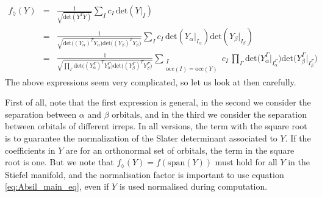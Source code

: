 \documentclass[a4paper,11pt]{article}
\begin{document}
\begin{eqnarray}
  f_\lozenge(Y)
  &=& \frac{1}{\sqrt{\text{det} \left( Y^T Y \right)}}
      \sum_{I} c_I \, \text{det} \left( Y\big|_I \right)\\
  &=& \frac{1}{\sqrt{
      \text{det} \Big( (Y_\alpha)^T Y_\alpha \Big)
      \text{det} \Big( (Y_\beta)^T Y_\beta \Big)
      }}
      \sum_{I} c_I \,
      \text{det} \left( Y_\alpha\big|_{I_\alpha} \right)
      \text{det} \left( Y_\beta\big|_{I_\beta} \right)\\\label{eq:f_diam_spin_irrep}
  &=& \frac{1}{\sqrt{
      \prod_\Gamma
      \text{det} \Big( (Y_\alpha^\Gamma)^T Y_\alpha^\Gamma \Big)
      \text{det} \Big( (Y_\beta^\Gamma)^T Y_\beta^\Gamma \Big)
      }}
      \sum_{\substack{I\\\text{occ}(I) = \text{occ}(Y)}} c_I \,
  \prod_\Gamma
  \text{det} \Big( Y_\alpha^\Gamma\big|_{I_\alpha^\Gamma} \Big)
  \text{det} \Big( Y_\beta^\Gamma\big|_{I_\beta^\Gamma} \Big)
\end{eqnarray}
The above expressions seem very complicated, so let us look at then carefully.

First of all, note that the first expression is general, in the second we consider the separation between $\alpha$ and $\beta$ orbitals, and in the third we consider the separation between orbitals of different irreps.
In all versions, the term with the square root is to guarantee the normalization of the Slater determinant associated to $Y$.
If the coefficients in $Y$ are for an orthonormal set of orbitals, the term in the square root is one.
But we note that $f_\lozenge(Y) = f(\text{span}(Y))$ must hold for all $Y$ in the Stiefel manifold, and the normalisation factor is important to use equation \ref{eq:Absil_main_eq}, even if $Y$ is used normalised during computation.
\end{document}
